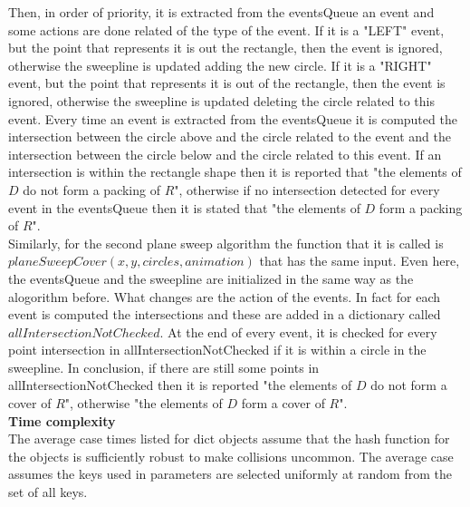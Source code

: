 \documentclass[12pt]{article}
\begin{document}
\noindent Then, in order of priority, it is extracted from the eventsQueue an event and some actions are done related of the type of the event. If it is a "LEFT" event, but the point that represents it is out the rectangle, then the event is ignored, otherwise the sweepline is updated adding the new circle. If it is a "RIGHT" event, but the point that represents it is out of the rectangle, then the event is ignored, otherwise the sweepline is updated deleting the circle related to this event. Every time an event is extracted from the eventsQueue it is computed the intersection between the circle above and the circle related to the event and the intersection between the circle below and the circle related to this event. If an intersection is within the rectangle shape then it is reported that "the elements of $D$ do not form a packing of $R$", otherwise if no intersection detected for every event in the eventsQueue then it is stated that "the elements of $D$ form a packing of $R$". \\

\noindent Similarly, for the second plane sweep algorithm the function that it is called is $planeSweepCover(x, y, circles, animation)$ that has the same input. Even here, the eventsQueue and the sweepline are initialized in the same way as the alogorithm before. What changes are the action of the  events. In fact for each event is computed the intersections and these are added in a dictionary called $allIntersectionNotChecked$. At the end of every event, it is checked for every point intersection in allIntersectionNotChecked if it is within a circle in the sweepline. In conclusion, if there are still some points in allIntersectionNotChecked then it is reported "the elements of $D$ do not form a cover of $R$", otherwise "the elements of $D$ form a cover of $R$". \\


\noindent \textbf{Time complexity}\\
The average case times listed for dict objects assume that the hash function for the objects is sufficiently robust to make collisions uncommon. The average case assumes the keys used in parameters are selected uniformly at random from the set of all keys. \cite{wiki:xx1}
\end{document}
